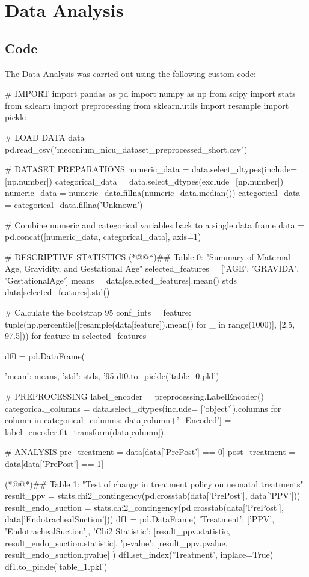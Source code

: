\documentclass[11pt]{article}
\begin{document}
\section{Data Analysis}
\subsection{{Code}}
The Data Analysis was carried out using the following custom code:

\begin{python}

# IMPORT
import pandas as pd
import numpy as np
from scipy import stats
from sklearn import preprocessing
from sklearn.utils import resample
import pickle

# LOAD DATA
data = pd.read_csv("meconium_nicu_dataset_preprocessed_short.csv")

# DATASET PREPARATIONS
numeric_data = data.select_dtypes(include=[np.number])
categorical_data = data.select_dtypes(exclude=[np.number])
numeric_data = numeric_data.fillna(numeric_data.median())
categorical_data = categorical_data.fillna('Unknown')

# Combine numeric and categorical variables back to a single data frame
data = pd.concat([numeric_data, categorical_data], axis=1)

# DESCRIPTIVE STATISTICS
(*@@*)## Table 0: "Summary of Maternal Age, Gravidity, and Gestational Age"
selected_features = ['AGE', 'GRAVIDA', 'GestationalAge']
means = data[selected_features].mean()
stds = data[selected_features].std()

# Calculate the bootstrap 95%
conf_ints = {feature: tuple(np.percentile([resample(data[feature]).mean() for _ in range(1000)], [2.5, 97.5])) for feature in selected_features}

df0 = pd.DataFrame({'mean': means, 'std': stds, '95%
df0.to_pickle('table_0.pkl')

# PREPROCESSING 
label_encoder = preprocessing.LabelEncoder()
categorical_columns = data.select_dtypes(include= ['object']).columns
for column in categorical_columns:
    data[column+'_Encoded'] = label_encoder.fit_transform(data[column])

# ANALYSIS
pre_treatment = data[data['PrePost'] == 0]
post_treatment = data[data['PrePost'] == 1]

(*@@*)## Table 1: "Test of change in treatment policy on neonatal treatments"
result_ppv = stats.chi2_contingency(pd.crosstab(data['PrePost'], data['PPV']))
result_endo_suction = stats.chi2_contingency(pd.crosstab(data['PrePost'], data['EndotrachealSuction']))
df1 = pd.DataFrame({
    'Treatment': ['PPV', 'EndotrachealSuction'],
    'Chi2 Statistic': [result_ppv.statistic, result_endo_suction.statistic],
    'p-value': [result_ppv.pvalue, result_endo_suction.pvalue]
})
df1.set_index('Treatment', inplace=True)
df1.to_pickle('table_1.pkl')

}
\end{python}
\end{document}
